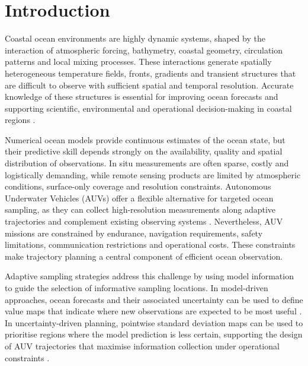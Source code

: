 \chapter{Introduction} \label{chap:intro}

Coastal ocean environments are highly dynamic systems, shaped by the interaction of atmospheric forcing, bathymetry, coastal geometry, circulation patterns and local mixing processes. These interactions generate spatially heterogeneous temperature fields, fronts, gradients and transient structures that are difficult to observe with sufficient spatial and temporal resolution. Accurate knowledge of these structures is essential for improving ocean forecasts and supporting scientific, environmental and operational decision-making in coastal regions \cite{wunsch2007stateestimation,dowd2014dataassimilation}.

Numerical ocean models provide continuous estimates of the ocean state, but their predictive skill depends strongly on the availability, quality and spatial distribution of observations. In situ measurements are often sparse, costly and logistically demanding, while remote sensing products are limited by atmospheric conditions, surface-only coverage and resolution constraints. Autonomous Underwater Vehicles (AUVs) offer a flexible alternative for targeted ocean sampling, as they can collect high-resolution measurements along adaptive trajectories and complement existing observing systems \cite{curtin2009aosn,hwang2019auvreview,bellingham2007robotics}. Nevertheless, AUV missions are constrained by endurance, navigation requirements, safety limitations, communication restrictions and operational costs. These constraints make trajectory planning a central component of efficient ocean observation.

Adaptive sampling strategies address this challenge by using model information to guide the selection of informative sampling locations. In model-driven approaches, ocean forecasts and their associated uncertainty can be used to define value maps that indicate where new observations are expected to be most useful \cite{lermusiaux2007adaptive,mendes2025oceanmodeldriven,fossum2018informationdriven}. In uncertainty-driven planning, pointwise standard deviation maps can be used to prioritise regions where the model prediction is less certain, supporting the design of AUV trajectories that maximise information collection under operational constraints \cite{bernacchi2025closingloop,duarte2025geostatistical}.

